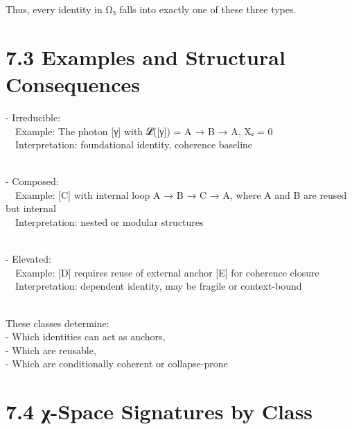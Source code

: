 Thus, every identity in Ω₃ falls into exactly one of these three types.

\section{7.3 \textbar{} Examples and Structural
Consequences}\label{examples-and-structural-consequences}

- Irreducible:\\
 Example: The photon {[}γ{]} with 𝓛({[}γ{]}) = A → B → A, Xₑ = 0\\
 Interpretation: foundational identity, coherence baseline\\
\strut \\
- Composed:\\
 Example: {[}C{]} with internal loop A → B → C → A, where A and B are
reused but internal\\
 Interpretation: nested or modular structures\\
\strut \\
- Elevated:\\
 Example: {[}D{]} requires reuse of external anchor {[}E{]} for
coherence closure\\
 Interpretation: dependent identity, may be fragile or context-bound\\
\strut \\
These classes determine:\\
- Which identities can act as anchors,\\
- Which are reusable,\\
- Which are conditionally coherent or collapse-prone

\section{7.4 \textbar{} χ-Space Signatures by
Class}\label{ux3c7-space-signatures-by-class}

